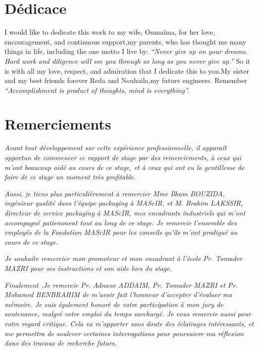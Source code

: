 \documentclass[11pt, a4paper, twoside]{book}
\author{Réalisé par : \\ Otmane BOUAYAD \vspace*{1truecm} \\ Encadré par : \\
Mme Ilham BOUZIDA : Encadrante professionnelle\\ 
Pr Tomader MAZRI : Encadrante académique\\
}
\date{(Du 15 Février au 30 Juin  2016)}
\begin{document}

\maketitle
\pagestyle{plain}
\frenchspacing
\chapter*{Dédicace}

I would like to dedicate this work to my wife, Oumaïma, for her love, encouragement, and continuous support,my parents, who has thought me many things in life, including the one motto I live by: 
\emph{“Never give up on your dreams. Hard work and diligence will see you through as long as you never give up.”}
 So it is with all my love, respect, and admiration that I dedicate this to you.My sister and my best friends forever Reda and Nouhaila,my future engineers. Remember
\emph{“Accomplishment is product of thoughts, mind is everything”.}

\chapter*{Remerciements}
\emph{
Avant tout développement sur cette expérience professionnelle, il apparaît opportun de commencer ce rapport de stage par des remerciements, à ceux qui m'ont beaucoup aidé au cours de ce stage, et à ceux qui ont eu la gentillesse de faire de ce stage un moment très profitable.\\}

\emph{
Aussi, je tiens plus particulièrement à remercier Mme Ilham
BOUZIDA, ingénieur qualité dans l’équipe packaging à MAScIR, et M. Brahim LAKSSIR, directeur de service packaging à MAScIR, mes encadrants industriels qui m'ont accompagné patiemment tout au long de ce stage. Je remercie l'ensemble des employés de la Fondation MAScIR pour les conseils qu’ils m'ont prodigué au cours de ce stage.\\}

\emph{Je souhaite remercier mon promoteur et mon encadrant à l'école Pr. Tomader MAZRI pour ses instructions et son aide lors du stage.\\}

\emph{Finalement ,Je remercie Pr. Adnane ADDAIM, Pr. Tomader MAZRI et Pr. Mohamed BENBRAHIM de m’avoir fait l’honneur d’accepter d’évaluer ma mémoire. Je suis également honoré de votre participation à mon jury de soutenance, malgré votre emploi du temps surchargé. Je vous remercie aussi pour votre regard critique. Cela va m'apporter sans doute des éclairages intéressants, et me permettra de soulever certaines interrogations pour poursuivre ma réflexion dans des travaux de recherche futurs. \\ }
\end{document}

